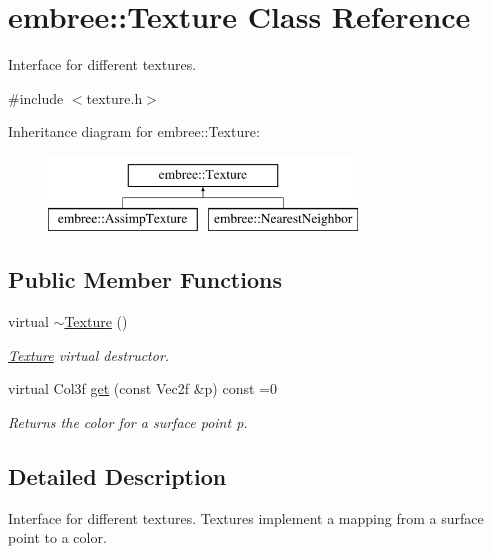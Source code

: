 \hypertarget{classembree_1_1_texture}{
\section{embree::Texture Class Reference}
\label{classembree_1_1_texture}
}


Interface for different textures.  




{\ttfamily \#include $<$texture.h$>$}

Inheritance diagram for embree::Texture:\begin{figure}[H]
\begin{center}
\leavevmode
\includegraphics[height=2.000000cm]{classembree_1_1_texture}
\end{center}
\end{figure}
\subsection*{Public Member Functions}
\begin{DoxyCompactItemize}
\item 
virtual \hyperlink{classembree_1_1_texture_a8be22466da0b6859c878c42330047e5d}{$\sim$Texture} ()
\begin{DoxyCompactList}\small\item\em \hyperlink{classembree_1_1_texture}{Texture} virtual destructor. \item\end{DoxyCompactList}\item 
virtual Col3f \hyperlink{classembree_1_1_texture_aa467dc197aaa52aad1312d45d499bb87}{get} (const Vec2f \&p) const =0
\begin{DoxyCompactList}\small\item\em Returns the color for a surface point p. \item\end{DoxyCompactList}\end{DoxyCompactItemize}


\subsection{Detailed Description}
Interface for different textures. Textures implement a mapping from a surface point to a color. 

